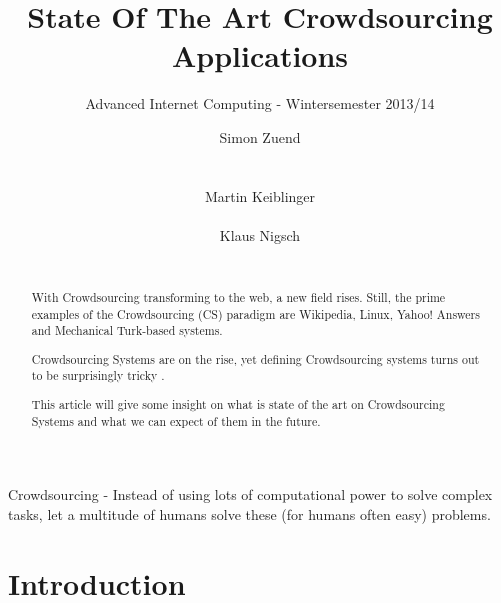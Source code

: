 \documentclass{sig-alternate}
\begin{document}
\title{State Of The Art Crowdsourcing Applications
}
\subtitle{Advanced Internet Computing - Wintersemester 2013/14
}

\author{
\alignauthor
Simon Zuend\\
       \\
       \\
\alignauthor
Martin Keiblinger\\
       \\
\alignauthor
Klaus Nigsch\\
       \\
}

\maketitle
\begin{abstract}

With Crowdsourcing transforming to the web, a new field rises. \cite{cswww}
Still, the prime examples of the Crowdsourcing (CS) paradigm are Wikipedia, 
Linux, Yahoo! Answers and Mechanical Turk-based systems.

Crowdsourcing Systems are on the rise, yet defining Crowdsourcing systems turns out to be
surprisingly tricky \cite{cswww}.

This article will give some insight on what is state of the art on Crowdsourcing Systems and
what we can expect of them in the future. 

\end{abstract}


Crowdsourcing - Instead of using lots of computational power to solve complex tasks, let a multitude of humans solve these (for humans often easy) problems.


\section{Introduction}
\end{document}
